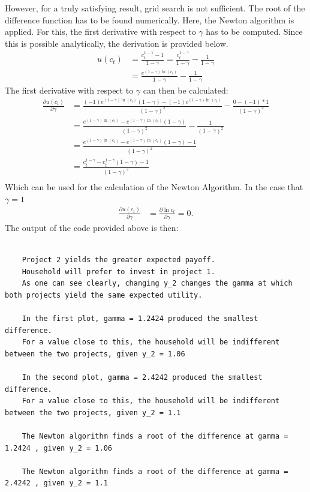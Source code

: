 \documentclass{article}
\begin{document}
	However, for a truly satisfying result, grid search is not sufficient. The root of the difference function has to be found numerically. Here, the Newton algorithm is applied. For this, the first derivative with respect to $\gamma$ has to be computed. Since this is possible analytically, the derivation is provided below.
	\begin{align}
		u(c_t) &= \frac{c_t^{1-\gamma}-1}{1- \gamma} = \frac{c_t^{1-\gamma}}{1- \gamma} -\frac{1}{1- \gamma}\\
		&= \frac{e^{(1-\gamma) \ln (c_t)}}{1- \gamma} -\frac{1}{1- \gamma}
	\end{align}
	The first derivative with respect to $\gamma$ can then be calculated:
	\begin{align}
		\frac{ \partial u(c_t)}{\partial \gamma} &= \frac{(-1)e^{(1-\gamma) \ln (c_t)} (1- \gamma)- (-1)e^{(1-\gamma) \ln (c_t)}}{(1- \gamma)^2} - \frac{0 - (-1)*1}{(1- \gamma)^2} \\
		&= \frac{e^{(1-\gamma) \ln (c_t)}-e^{(1-\gamma) \ln (c_t)} (1- \gamma)}{(1- \gamma)^2} - \frac{1}{(1- \gamma)^2} \\
		&= \frac{e^{(1-\gamma) \ln (c_t)}-e^{(1-\gamma) \ln (c_t)} (1- \gamma)-1}{(1- \gamma)^2} \\
		&= \frac{c_t^{1- \gamma}-c_t^{1- \gamma} (1- \gamma)-1}{(1- \gamma)^2} \\  
	\end{align}
	Which can be used for the calculation of the Newton Algorithm.
	In the case that $ \gamma = 1 $
	\begin{align}\frac{ \partial u(c_t)}{\partial \gamma} &= \frac{ \partial \ln c_t}{\partial \gamma} = 0.
	\end{align}
	The output of the code provided above is then:
	\begin{lstlisting}[style=Matlab-editor]
	
	Project 2 yields the greater expected payoff.
	Household will prefer to invest in project 1.
	As one can see clearly, changing y_2 changes the gamma at which both projects yield the same expected utility.
	
	In the first plot, gamma = 1.2424 produced the smallest difference. 
	For a value close to this, the household will be indifferent between the two projects, given y_2 = 1.06 
	
	In the second plot, gamma = 2.4242 produced the smallest difference. 
	For a value close to this, the household will be indifferent between the two projects, given y_2 = 1.1 
	
	The Newton algorithm finds a root of the difference at gamma = 1.2424 , given y_2 = 1.06 
	
	The Newton algorithm finds a root of the difference at gamma = 2.4242 , given y_2 = 1.1 
	\end{lstlisting}
\end{document}
